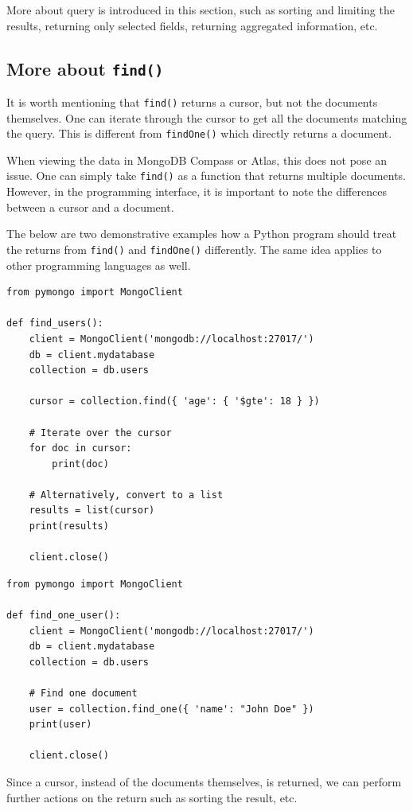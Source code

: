 More about query is introduced in this section, such as sorting and limiting the results, returning only selected fields, returning aggregated information, etc.

\subsection{More about \texttt{find()}}

It is worth mentioning that \verb|find()| returns a cursor, but not the documents themselves. One can iterate through the cursor to get all the documents matching the query. This is different from \verb|findOne()| which directly returns a document.

When viewing the data in MongoDB Compass or Atlas, this does not pose an issue. One can simply take \verb|find()| as a function that returns multiple documents. However, in the programming interface, it is important to note the differences between a cursor and a document.

The below are two demonstrative examples how a Python program should treat the returns from \verb|find()| and \verb|findOne()| differently. The same idea applies to other programming languages as well.

\begin{lstlisting}
from pymongo import MongoClient

def find_users():
	client = MongoClient('mongodb://localhost:27017/')
	db = client.mydatabase
	collection = db.users

	cursor = collection.find({ 'age': { '$gte': 18 } })

	# Iterate over the cursor
	for doc in cursor:
		print(doc)
	
	# Alternatively, convert to a list
	results = list(cursor)
	print(results)

	client.close()
\end{lstlisting}

\begin{lstlisting}
from pymongo import MongoClient

def find_one_user():
	client = MongoClient('mongodb://localhost:27017/')
	db = client.mydatabase
	collection = db.users

	# Find one document
	user = collection.find_one({ 'name': "John Doe" })
	print(user)

	client.close()
\end{lstlisting}

Since a cursor, instead of the documents themselves, is returned, we can perform further actions on the return such as sorting the result, etc.

